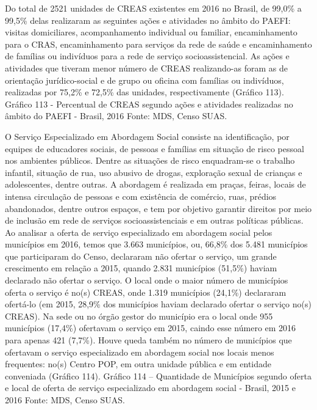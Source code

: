 \documentclass[
  brazilian]{report}
\begin{document}
Do total de 2521 unidades de CREAS existentes em 2016 no Brasil, de
99,0\% a 99,5\% delas realizaram as seguintes ações e atividades no
âmbito do PAEFI: visitas domiciliares, acompanhamento individual ou
familiar, encaminhamento para o CRAS, encaminhamento para serviços da
rede de saúde e encaminhamento de famílias ou indivíduos para a rede de
serviço socioassistencial. As ações e atividades que tiveram menor
número de CREAS realizando-as foram as de orientação jurídico-social e
de grupo ou oficina com famílias ou indivíduos, realizadas por 75,2\% e
72,5\% das unidades, respectivamente (Gráfico 113). Gráfico 113 -
Percentual de CREAS segundo ações e atividades realizadas no âmbito do
PAEFI - Brasil, 2016 Fonte: MDS, Censo SUAS.

O Serviço Especializado em Abordagem Social consiste na identificação,
por equipes de educadores sociais, de pessoas e famílias em situação de
risco pessoal nos ambientes públicos. Dentre as situações de risco
enquadram-se o trabalho infantil, situação de rua, uso abusivo de
drogas, exploração sexual de crianças e adolescentes, dentre outras. A
abordagem é realizada em praças, feiras, locais de intensa circulação de
pessoas e com existência de comércio, ruas, prédios abandonados, dentre
outros espaços, e tem por objetivo garantir direitos por meio de
inclusão em rede de serviços socioassistenciais e em outras políticas
públicas. Ao analisar a oferta de serviço especializado em abordagem
social pelos municípios em 2016, temos que 3.663 municípios, ou, 66,8\%
dos 5.481 municípios que participaram do Censo, declararam não ofertar o
serviço, um grande crescimento em relação a 2015, quando 2.831
municípios (51,5\%) haviam declarado não ofertar o serviço. O local onde
o maior número de municípios oferta o serviço é no(s) CREAS, onde 1.319
municípios (24,1\%) declararam ofertá-lo (em 2015, 28,9\% dos municípios
haviam declarado ofertar o serviço no(s) CREAS). Na sede ou no órgão
gestor do município era o local onde 955 municípios (17,4\%) ofertavam o
serviço em 2015, caindo esse número em 2016 para apenas 421 (7,7\%).
Houve queda também no número de municípios que ofertavam o serviço
especializado em abordagem social nos locais menos frequentes: no(s)
Centro POP, em outra unidade pública e em entidade conveniada (Gráfico
114). Gráfico 114 -- Quantidade de Municípios segundo oferta e local de
oferta de serviço especializado em abordagem social - Brasil, 2015 e
2016 Fonte: MDS, Censo SUAS.
\end{document}
